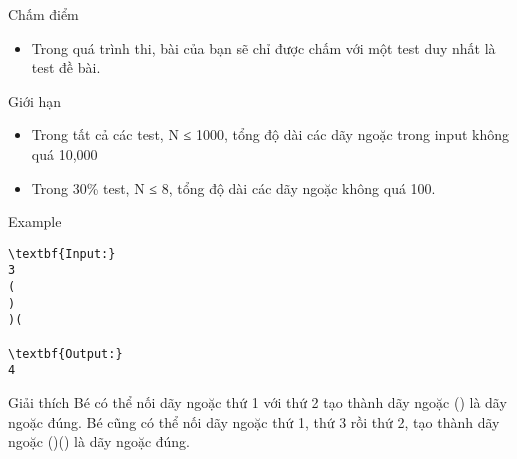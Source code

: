 Chấm điểm  
\begin{itemize}
	\item     Trong quá trình thi, bài của bạn sẽ chỉ được chấm với một test duy nhất là test đề bài.   
\end{itemize}
   Giới hạn  
\begin{itemize}
	\item     Trong tất cả các test, N ≤ 1000, tổng độ dài các dãy ngoặc trong input không quá 10,000   
	\item     Trong 30\% test, N ≤ 8, tổng độ dài các dãy ngoặc không quá 100.   
\end{itemize}
   Example  
\begin{verbatim}
\textbf{Input:}
3
(
)
)(

\textbf{Output:}
4
\end{verbatim}
   Giải thích  
Bé có thể nối dãy ngoặc thứ 1 với thứ 2 tạo thành dãy ngoặc () là dãy ngoặc đúng. Bé cũng có thể nối dãy ngoặc thứ 1, thứ 3 rồi thứ 2, tạo thành dãy ngoặc ()() là dãy ngoặc đúng.